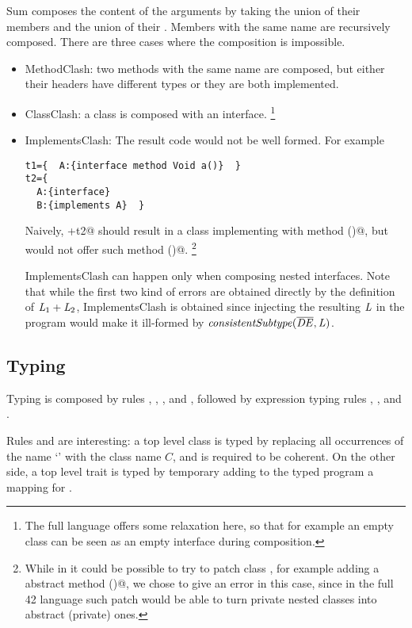 Sum composes the content of the arguments
by taking the union of their members and the union of their \Q@implements@.
Members with the same name are recursively composed.
There are three cases where the composition is impossible.
\begin{itemize}
\item MethodClash: two methods with the same name are composed,
but either their headers have different types or they are both implemented.
\item ClassClash: a class is composed with an interface.%
\footnote{
The full language offers some relaxation here, so that for example an empty class can be seen as an empty interface during composition.
}
\item ImplementsClash:
The result code would not be well formed.
For example
\begin{lstlisting}
t1={  A:{interface method Void a()}  }
t2={
  A:{interface}
  B:{implements A}  }
\end{lstlisting}
Naively, +t2@ should result in a class \Q@B@ implementing \Q@A@ with method \Q@a()@,
but \Q@B@ would not offer such method \Q@a()@.%
\footnote{While in \name it could be possible to try to patch class \Q@B@, for example adding a
abstract method \Q@a()@, we chose to give an error in this case, since in the full 42 language
such patch would 
be able to turn private nested classes
into abstract (private) ones.}

ImplementsClash can happen only when composing nested interfaces. Note that while the first two kind of errors are obtained directly by the definition of 
$\mathit{L}_1+\mathit{L}_2$, ImplementsClash is obtained since injecting the resulting 
$\mathit{L}$ in the program would make it ill-formed by 
$\mathit{consistentSubtype}(\overline{\mathit{DE}},\mathit{L})$.
\end{itemize}
\saveSpace
\subsection{Typing}
\saveSpace
Typing is composed by rules , ,
,
 and ,
followed by expression typing rules
, ,  and .

Rules  and 
are interesting: a top level class is typed by replacing all occurrences of the name `\Q@This@' with the class name $C$,
and is required to be coherent.
On the other side, a top level trait is typed by temporary adding to the typed program a mapping for
\Q@This@.

